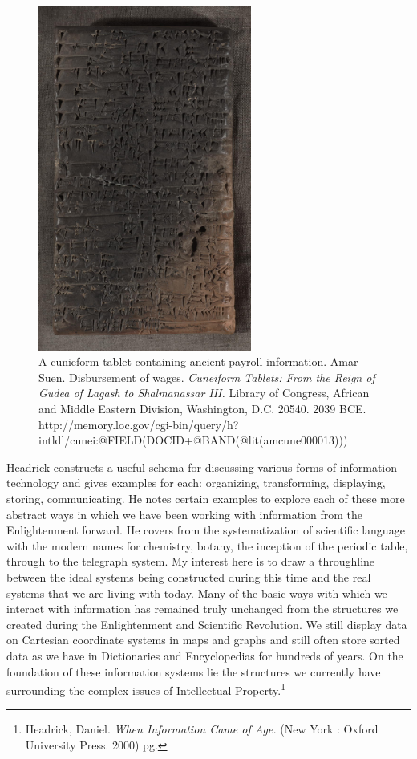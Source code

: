 \documentclass[11pt]{article}
\begin{document}
\begin{figure}[ht!]
\center
\includegraphics[width=70mm, angle=90]{cuniform_tablet.jpg}
\caption{A cunieform tablet containing ancient payroll information. Amar-Suen. Disbursement of wages. \emph{Cuneiform Tablets: From the Reign of Gudea of Lagash to Shalmanassar III.} Library of Congress, African and Middle Eastern Division, Washington, D.C. 20540. 2039 BCE. http://memory.loc.gov/cgi-bin/query/h?intldl/cunei:@FIELD(DOCID+@BAND(@lit(amcune000013)))}
\end{figure}

Headrick constructs a useful schema for discussing various forms of information technology and gives examples for each: organizing, transforming, displaying, storing, communicating.  He notes certain examples to explore each of these more abstract ways in which we have been working with information from the Enlightenment forward. He covers from the systematization of scientific language with the modern names for chemistry, botany, the inception of the periodic table, through to the telegraph system. My interest here is to draw a throughline between the ideal systems being constructed during this time and the real systems that we are living with today. Many of the basic ways with which we interact with information has remained truly unchanged from the structures we created during the Enlightenment  and Scientific Revolution. We still display data on Cartesian coordinate systems in maps and graphs and still often store sorted data as we have in Dictionaries and Encyclopedias for hundreds of years. On the foundation of these information systems lie the structures we currently have surrounding the complex issues of Intellectual Property.\footnote{Headrick, Daniel. \emph{When Information Came of Age.} (New York : Oxford University Press. 2000) pg.}
\end{document}
